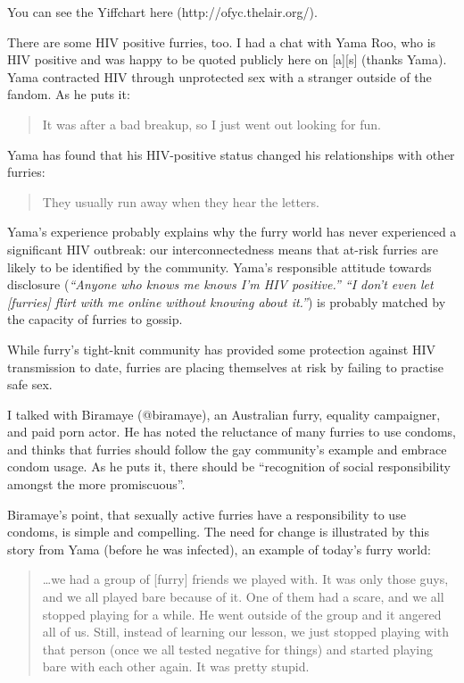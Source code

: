 You can see the Yiffchart here (http://ofyc.thelair.org/).

There are some HIV positive furries, too. I had a chat with Yama Roo, who is HIV positive and was happy to be quoted publicly here on [a][s] (thanks Yama). Yama contracted HIV through unprotected sex with a stranger outside of the fandom. As he puts it:

\begin{quote}
  It was after a bad breakup, so I just went out looking for fun.
\end{quote}

Yama has found that his HIV-positive status changed his relationships with other furries:

\begin{quote}
  They usually run away when they hear the letters.
\end{quote}

Yama's experience probably explains why the furry world has never experienced a significant HIV outbreak: our interconnectedness means that at-risk furries are likely to be identified by the community. Yama's responsible attitude towards disclosure (\textit{``Anyone who knows me knows I'm HIV positive.'' ``I don't even let [furries] flirt with me online without knowing about it.''}) is probably matched by the capacity of furries to gossip.

While furry's tight-knit community has provided some protection against HIV transmission to date, furries are placing themselves at risk by failing to practise safe sex.

I talked with Biramaye (@biramaye), an Australian furry, equality campaigner, and paid porn actor. He has noted the reluctance of many furries to use condoms, and thinks that furries should follow the gay community's example and embrace condom usage. As he puts it, there should be ``recognition of social responsibility amongst the more promiscuous''.

Biramaye's point, that sexually active furries have a responsibility to use condoms, is simple and compelling. The need for change is illustrated by this story from Yama (before he was infected), an example of today's furry world:

\begin{quote}
  \ldots we had a group of [furry] friends we played with. It was only those guys, and we all played bare because of it. One of them had a scare, and we all stopped playing for a while. He went outside of the group and it angered all of us. Still, instead of learning our lesson, we just stopped playing with that person (once we all tested negative for things) and started playing bare with each other again. It was pretty stupid.
\end{quote}

